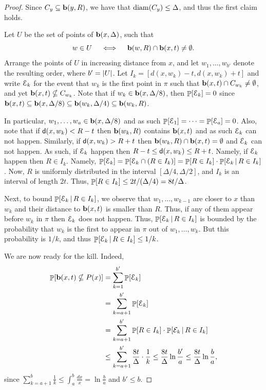 \begin{proof}
    Since $C_y \subseteq \mathbf{b}(y, R)$, we have that $\mathrm{diam}(C_y) \leq
    \Delta$, and thus the first claim holds.
        
    Let $U$ be the set of points of $\mathbf{b}(x, \Delta)$, such that    
    \[
        w \in U \quad\iff\quad%
        \Ball(w,R) \cap \Ball(x,t) \ne \emptyset.
    \]
    Arrange
    the points of $U$ in increasing distance from $x$, and let $w_1,
    \ldots, w_{b'}$ denote the resulting order, where $b'=
    \left| {U} \right|$.  Let $I_k = [d(x, w_k)-t, d(x,w_k)+t]$ and write
    $\EuScript{E}_k$ for the event that $w_k$ is the first point in $\pi$
    such that $\mathbf{b}(x,t) \cap C_{w_k} \neq \emptyset$, and yet
    $\mathbf{b}(x,t) \nsubseteq C_{w_k}$.  Note that if $w_k \in \mathbf{b}(x,
    \Delta/8)$, then $\Prob{\Event_k} = 0$ since $\mathbf{b}(x, t)
    \subseteq \mathbf{b}(x, \Delta/8) \subseteq \mathbf{b}(w_k, \Delta/4)
    \subseteq \mathbf{b}(w_k, R)$.
    
    In particular, $w_1, \ldots, w_a \in \mathbf{b}(x,\Delta/8)$ and as
    such $\Prob{ \Event_1} = \cdots = \Prob{ \Event_a} = 0$.  Also,
    note that if $\mathsf{d}(x, w_k)< R- t$ then $\mathbf{b}(w_k, R)$ contains
    $\mathbf{b}(x, t)$ and as such $\EuScript{E}_k$ can not happen. Similarly, if
    $\mathsf{d}(x, w_k) > R + t$ then $\mathbf{b}(w_k, R) \cap \mathbf{b}(x, t) =
    \emptyset$ and $\EuScript{E}_k$ can not happen. As such, if $\EuScript{E}_k$
    happen then $R-t \leq \mathsf{d}(x,w_k) \leq R+t$. Namely, if
    $\EuScript{E}_k$ happen then $R \in I_k$. Namely, $\Prob{ \Event_k } =
    \Prob{ \Event_k \cap (R \in I_k) } = \Prob{R \in I_k} \cdot \Prob{
       \Event_k\,|\,R \in I_k}$. Now, $R$ is uniformly distributed in
    the interval $[\Delta/4, \Delta/2]$, and $I_k$ is an interval of
    length $2t$. Thus, $\Prob{R \in I_k} \leq 2t/(\Delta/4) =
    8t/\Delta$. 
    
    Next, to bound $\Prob{ \Event_k\,|\,R \in I_k}$, we observe that
    $w_1, \ldots, w_{k-1}$ are closer to $x$ than $w_k$ and their
    distance to $\mathbf{b}(x,t)$ is smaller than $R$. Thus, if any of them
    appear before $w_k$ in $\pi$ then $\EuScript{E}_k$ does not
    happen. Thus, $\Prob{ \Event_k\,|\,R \in I_k}$ is bounded by the
    probability that $w_k$ is the first to appear in $\pi$ out of
    $w_1, \ldots, w_k$. But this probability is $1/k$, and thus
    $\Prob{ \Event_k\,|\,R \in I_k} \leq 1/k$.
    
    We are now ready for the kill. Indeed,
    \begin{align*}
      \Prob{\Ball(x,t) \nsubseteq P(x)}%
      &=%
        \sum_{k=1}^{b'} \Prob{\Event_k}
      \\&
        = \sum_{k=a+1}^{b'} \Prob{\Event_k}
      \\&
        =%
        \sum_{k=a+1}^{b'} \Prob{R \in I_k} \cdot \Prob{\mathcal
        E_k\,|\,R \in I_k}     %
      \\&
      \leq%
      \sum_{k=a+1}^{b'} \frac{8t}{\Delta} \cdot \frac{1}{k}%
      \leq%
      \frac{8t}{\Delta} \ln \frac{b'}{a}%
      \leq%
      \frac{8t}{\Delta} \ln \frac{b}{a},
    \end{align*}
    since $\sum_{k=a+1}^b \frac{1}{k} \leq \int_{a}^b \frac{dx}{x} =
    \ln \frac{b}{a}$ and $b' \leq b$.
\end{proof}


